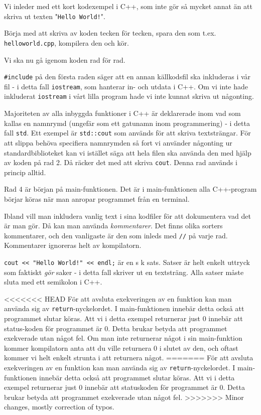Vi inleder med ett kort kodexempel i C++, som inte gör så mycket annat än att skriva ut texten "\texttt{Hello World!}".



Börja med att skriva av koden tecken för tecken, spara den som t.ex. \texttt{helloworld.cpp}, kompilera den och kör.

Vi ska nu gå igenom koden rad för rad.

\texttt{\#include} på den första raden säger att en annan källkodsfil ska inkluderas i vår fil - i detta fall \texttt{iostream}, som hanterar in- och utdata i C++. Om vi inte hade inkluderat \texttt{iostream} i vårt lilla program hade vi inte kunnat skriva ut någonting. 

Majoriteten av alla inbyggda funktioner i C++ är deklarerade inom vad som kallas en namnrymd (ungefär som ett gatunamn inom programmering) - i detta fall \texttt{std}. Ett exempel är \texttt{std::cout} som används för att skriva textsträngar. För att slippa behöva specifiera namnrymden så fort vi använder någonting ur standardbiblioteket kan vi istället säga att hela filen ska använda den med hjälp av koden på rad 2. Då räcker det med att skriva \texttt{cout}. Denna rad används i princip alltid.

Rad 4 är början på main-funktionen. Det är i main-funktionen alla C++-program börjar köras när man anropar programmet från en terminal.

Ibland vill man inkludera vanlig text i sina kodfiler för att dokumentera vad det är man gör. Då kan man använda \emph{kommentarer}. Det finns olika sorters kommentarer, och den vanligaste är den som inleds med \texttt{//} på varje rad. Kommentarer ignoreras helt av kompilatorn.

\texttt{cout << "Hello World!" << endl;} är en s k sats. Satser är helt enkelt uttryck som faktiskt \emph{gör} saker - i detta fall skriver ut en textsträng. Alla satser måste sluta med ett semikolon i C++.

<<<<<<< HEAD
För att avsluta exekveringen av en funktion kan man använda sig av \texttt{return}-nyckelordet. I main-funktionen innebär detta också att programmet slutar köras. Att vi i detta exempel returnerar just 0 innebär att status-koden för programmet är 0. Detta brukar betyda att programmet exekverade utan något fel. Om man inte returnerar något i sin main-funktion kommer kompilatorn anta att du ville returnera 0 i slutet av den, och oftast kommer vi helt enkelt strunta i att returnera något.
=======
För att avsluta exekveringen av en funktion kan man använda sig av \texttt{return}-nyckelordet. I main-funktionen innebär detta också att programmet slutar köras. Att vi i detta exempel returnerar just 0 innebär att statuskoden för programmet är 0. Detta brukar betyda att programmet exekverade utan något fel.
>>>>>>> Minor changes, mostly correction of typos.
